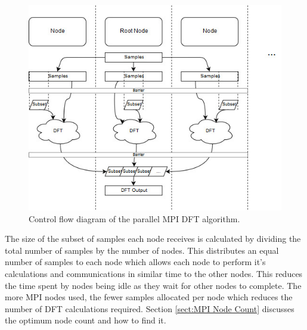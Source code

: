 \documentclass[11pt,a4paper]{article}
\begin{document}
\begin{figure}[H]
\begin{center}
\includegraphics[scale=0.5]{mpi_impl1}
\end{center}
\caption{Control flow diagram of the parallel MPI DFT algorithm.}
\label{fig:mpi_impl1}
\end{figure}

The size of the subset of samples each node receives is calculated by dividing the total number of samples by the number of nodes. This distributes an equal number of samples to each node which allows each node to perform it's calculations and communications in similar time to the other nodes. This reduces the time spent by nodes being idle as they wait for other nodes to complete. The more MPI nodes used, the fewer samples allocated per node which reduces the number of DFT calculations required. Section \ref{sect:MPI Node Count} discusses the optimum node count and how to find it.

\begin{figure}[H]%
    \centering
    \qquad
    \vspace{5pt}
    \caption{}%
    \label{fig:mpi_code}%
\end{figure}
\end{document}
